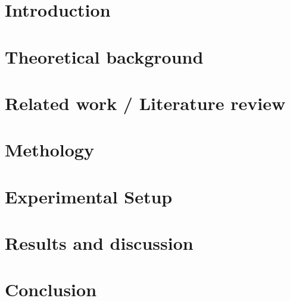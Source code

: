 \documentclass[british, twoside]{ntnuthesis}  %
\begin{document}
    

    
    \chapter{Introduction}
    \lipsum[1]
    
    
    \chapter{Theoretical background}
        

    \chapter{Related work / Literature review}
        

    \chapter{Methology}
        

    \chapter{Experimental Setup}
        

    \chapter{Results and discussion}

    \chapter{Conclusion}
\end{document}
